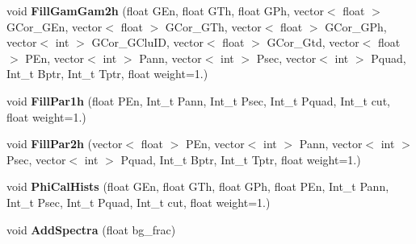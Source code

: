 \begin{DoxyCompactItemize}
\item 
\hypertarget{classhists_a77c5d523f6064a42098c029ffaa0fbbc}{void {\bfseries Fill\-Gam\-Gam2h} (float G\-En, float G\-Th, float G\-Ph, vector$<$ float $>$ G\-Cor\-\_\-\-G\-En, vector$<$ float $>$ G\-Cor\-\_\-\-G\-Th, vector$<$ float $>$ G\-Cor\-\_\-\-G\-Ph, vector$<$ int $>$ G\-Cor\-\_\-\-G\-Clu\-I\-D, vector$<$ float $>$ G\-Cor\-\_\-\-Gtd, vector$<$ float $>$ P\-En, vector$<$ int $>$ Pann, vector$<$ int $>$ Psec, vector$<$ int $>$ Pquad, Int\-\_\-t Bptr, Int\-\_\-t Tptr, float weight=1.)}\label{classhists_a77c5d523f6064a42098c029ffaa0fbbc}

\item 
\hypertarget{classhists_a618651882b77d410480e624dfd4b8ee4}{void {\bfseries Fill\-Par1h} (float P\-En, Int\-\_\-t Pann, Int\-\_\-t Psec, Int\-\_\-t Pquad, Int\-\_\-t cut, float weight=1.)}\label{classhists_a618651882b77d410480e624dfd4b8ee4}

\item 
\hypertarget{classhists_abdb2e69023e9fdd9080bcef611c26125}{void {\bfseries Fill\-Par2h} (vector$<$ float $>$ P\-En, vector$<$ int $>$ Pann, vector$<$ int $>$ Psec, vector$<$ int $>$ Pquad, Int\-\_\-t Bptr, Int\-\_\-t Tptr, float weight=1.)}\label{classhists_abdb2e69023e9fdd9080bcef611c26125}

\item 
\hypertarget{classhists_ab48ef7120a82723ec1db8fde8143d532}{void {\bfseries Phi\-Cal\-Hists} (float G\-En, float G\-Th, float G\-Ph, float P\-En, Int\-\_\-t Pann, Int\-\_\-t Psec, Int\-\_\-t Pquad, Int\-\_\-t cut, float weight=1.)}\label{classhists_ab48ef7120a82723ec1db8fde8143d532}

\item 
\hypertarget{classhists_a52b2233e6775d4a9bf714368101116cb}{void {\bfseries Add\-Spectra} (float bg\-\_\-frac)}\label{classhists_a52b2233e6775d4a9bf714368101116cb}

\end{DoxyCompactItemize}
